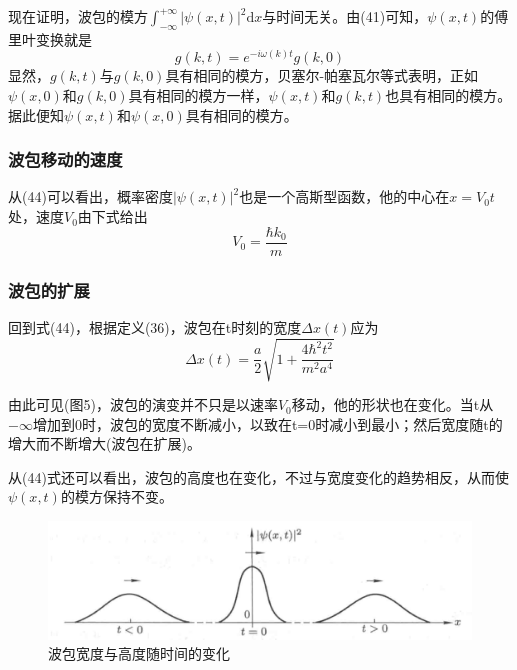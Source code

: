\documentclass[]{article}
\begin{document}
现在证明，波包的模方$\int^{+\infty}_{-\infty}|\psi(x,t)|^2\mathrm{d}x$与时间无关。由(41)可知，$\psi(x,t)$的傅里叶变换就是
\begin{equation}
	g(k,t)=e^{-i\omega(k)t}g(k,0)
\end{equation}
显然，$g(k,t)$与$g(k,0)$具有相同的模方，贝塞尔-帕塞瓦尔等式表明，正如$\psi(x,0)$和$g(k,0)$具有相同的模方一样，$\psi(x,t)$和$g(k,t)$也具有相同的模方。据此便知$\psi(x,t)$和$\psi(x,0)$具有相同的模方。
\subsubsection{波包移动的速度}
从(44)可以看出，概率密度$|\psi(x,t)|^2$也是一个高斯型函数，他的中心在$x=V_0t$处，速度$V_0$由下式给出
\begin{equation}
	V_0=\dfrac{\hbar k_0}{m}
\end{equation}
\subsubsection{波包的扩展}
回到式(44)，根据定义(36)，波包在t时刻的宽度$\Delta x(t)$应为
\begin{equation}
	\Delta x(t)=\dfrac{a}{2}\sqrt{1+\dfrac{4\hbar^2t^2}{m^2a^4}}
\end{equation}

由此可见(图5)，波包的演变并不只是以速率$V_0$移动，他的形状也在变化。当t从$-\infty$增加到0时，波包的宽度不断减小，以致在t=0时减小到最小；然后宽度随t的增大而不断增大(波包在扩展)。\par 
从(44)式还可以看出，波包的高度也在变化，不过与宽度变化的趋势相反，从而使$\psi(x,t)$的模方保持不变。
\begin{figure}[H]
	\centering
	\includegraphics[scale=0.2]{5.png}
	\caption{波包宽度与高度随时间的变化}
	\label{Figure 5}
\end{figure}
\end{document}
